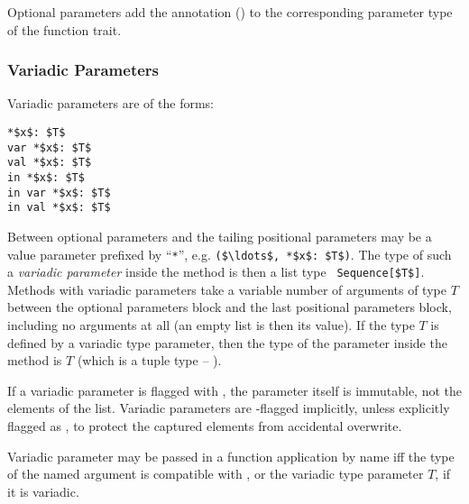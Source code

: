 Optional parameters add the annotation ()  to the corresponding parameter type of the function trait. 






\subsubsection{Variadic Parameters}
\label{sec:variadic-parameters}

Variadic parameters are of the forms:
\begin{lstlisting}
*$x$: $T$
var *$x$: $T$
val *$x$: $T$
in *$x$: $T$
in var *$x$: $T$
in val *$x$: $T$
\end{lstlisting}

Between optional parameters and the tailing positional parameters may be a value parameter prefixed by ``\lstinline!*!'', e.g. \lstinline!($\ldots$, *$x$: $T$)!. The type of such a {\em variadic parameter} inside the method is then a list type ~\lstinline!Sequence[$T$]!. Methods with variadic parameters take a variable number of arguments of type $T$ between the optional parameters block and the last positional parameters block, including no arguments at all (an empty list is then its value). If the type $T$ is defined by a variadic type parameter, then the type of the parameter inside the method is $T$ (which is a tuple type -- ). 

If a variadic parameter is flagged with , the parameter itself is immutable, not the elements of the list. Variadic parameters are -flagged implicitly, unless explicitly flagged as , to protect the captured elements from accidental overwrite. 

Variadic parameter may be passed in a function application by name iff the type of the named argument is compatible with , or the variadic type parameter $T$, if it is variadic. 

